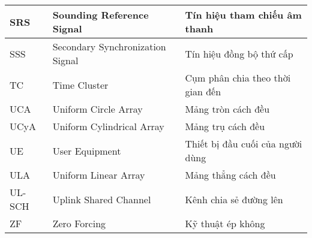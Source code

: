 {{\begin{longtable}{|p{2.35cm}|>{\raggedright}p{6.2cm}|p{5.75cm}|}
\hline
SRS & Sounding Reference Signal & Tín hiệu tham chiếu âm thanh \\ 
\hline
SSS & Secondary Synchronization Signal & Tín hiệu đồng bộ thứ cấp \\ 
\hline
TC & Time Cluster & Cụm phân chia theo thời gian đến \\
\hline
UCA & Uniform Circle Array & Mảng tròn cách đều \\ 
\hline
UCyA & Uniform Cylindrical Array & Mảng trụ cách đều \\ 
\hline
UE & User Equipment & Thiết bị đầu cuối của người dùng \\
\hline
ULA & Uniform Linear Array & Mảng thẳng cách đều \\ 
\hline
UL-SCH & Uplink Shared Channel & Kênh chia sẻ đường lên \\ 
\hline
ZF & Zero Forcing & Kỹ thuật ép không \\
\hline
\end{longtable}
}
}   
			